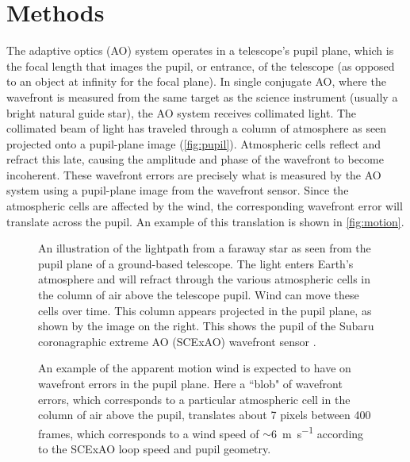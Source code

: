 \section{Methods} \label{sec:methods}

The adaptive optics (AO) system operates in a telescope's pupil plane, which is the focal length that images the pupil, or entrance, of the telescope (as opposed to an object at infinity for the focal plane). In single conjugate AO, where the wavefront is measured from the same target as the science instrument (usually a bright natural guide star), the AO system receives collimated light. The collimated beam of light has traveled through a column of atmosphere as seen projected onto a pupil-plane image (\autoref{fig:pupil}). Atmospheric cells reflect and refract this late, causing the amplitude and phase of the wavefront to become incoherent. These wavefront errors are precisely what is measured by the AO system using a pupil-plane image from the wavefront sensor. Since the atmospheric cells are affected by the wind, the corresponding wavefront error will translate across the pupil. An example of this translation is shown in \autoref{fig:motion}.

\begin{figure}
    \centering
    \caption{An illustration of the lightpath from a faraway star as seen from the pupil plane of a ground-based telescope. The light enters Earth's atmosphere and will refract through the various atmospheric cells in the column of air above the telescope pupil. Wind can move these cells over time. This column appears projected in the pupil plane, as shown by the image on the right. This shows the pupil of the Subaru coronagraphic extreme AO (SCExAO) wavefront sensor \citep{guyon_wavefront_2011}.}
    \label{fig:pupil}
\end{figure}


\begin{figure}
    \centering
    \caption{An example of the apparent motion wind is expected to have on wavefront errors in the pupil plane. Here a ``blob" of wavefront errors, which corresponds to a particular atmospheric cell in the column of air above the pupil, translates about 7 pixels between 400 frames, which corresponds to a wind speed of $\sim$\SI{6}{\meter\per\second} according to the SCExAO loop speed and pupil geometry.}
    \label{fig:motion}
\end{figure}

